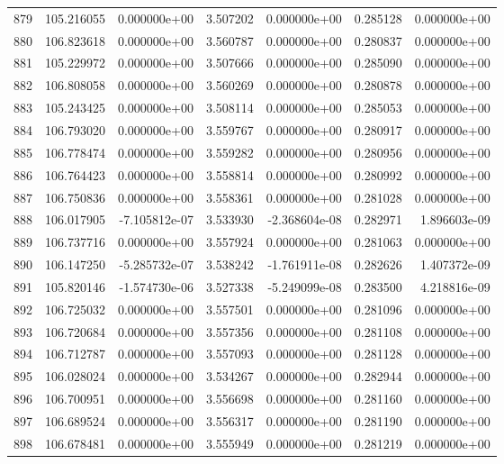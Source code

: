 \begin{tabular}{rrrrrrr}
 879 & 105.216055 &  0.000000e+00 &  3.507202 &  0.000000e+00 &    0.285128 &  0.000000e+00 \\
 880 & 106.823618 &  0.000000e+00 &  3.560787 &  0.000000e+00 &    0.280837 &  0.000000e+00 \\
 881 & 105.229972 &  0.000000e+00 &  3.507666 &  0.000000e+00 &    0.285090 &  0.000000e+00 \\
 882 & 106.808058 &  0.000000e+00 &  3.560269 &  0.000000e+00 &    0.280878 &  0.000000e+00 \\
 883 & 105.243425 &  0.000000e+00 &  3.508114 &  0.000000e+00 &    0.285053 &  0.000000e+00 \\
 884 & 106.793020 &  0.000000e+00 &  3.559767 &  0.000000e+00 &    0.280917 &  0.000000e+00 \\
 885 & 106.778474 &  0.000000e+00 &  3.559282 &  0.000000e+00 &    0.280956 &  0.000000e+00 \\
 886 & 106.764423 &  0.000000e+00 &  3.558814 &  0.000000e+00 &    0.280992 &  0.000000e+00 \\
 887 & 106.750836 &  0.000000e+00 &  3.558361 &  0.000000e+00 &    0.281028 &  0.000000e+00 \\
 888 & 106.017905 & -7.105812e-07 &  3.533930 & -2.368604e-08 &    0.282971 &  1.896603e-09 \\
 889 & 106.737716 &  0.000000e+00 &  3.557924 &  0.000000e+00 &    0.281063 &  0.000000e+00 \\
 890 & 106.147250 & -5.285732e-07 &  3.538242 & -1.761911e-08 &    0.282626 &  1.407372e-09 \\
 891 & 105.820146 & -1.574730e-06 &  3.527338 & -5.249099e-08 &    0.283500 &  4.218816e-09 \\
 892 & 106.725032 &  0.000000e+00 &  3.557501 &  0.000000e+00 &    0.281096 &  0.000000e+00 \\
 893 & 106.720684 &  0.000000e+00 &  3.557356 &  0.000000e+00 &    0.281108 &  0.000000e+00 \\
 894 & 106.712787 &  0.000000e+00 &  3.557093 &  0.000000e+00 &    0.281128 &  0.000000e+00 \\
 895 & 106.028024 &  0.000000e+00 &  3.534267 &  0.000000e+00 &    0.282944 &  0.000000e+00 \\
 896 & 106.700951 &  0.000000e+00 &  3.556698 &  0.000000e+00 &    0.281160 &  0.000000e+00 \\
 897 & 106.689524 &  0.000000e+00 &  3.556317 &  0.000000e+00 &    0.281190 &  0.000000e+00 \\
 898 & 106.678481 &  0.000000e+00 &  3.555949 &  0.000000e+00 &    0.281219 &  0.000000e+00 \\

\end{tabular}
